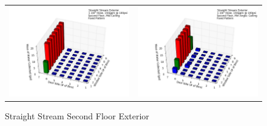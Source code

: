 \documentclass{article}
\begin{document}
\begin{appendices}
\begin{figure}[ht]
{\begin{tabular*}{\textwidth}{lr}
\includegraphics[width=3.2in]{../ADD_Analysis/Figures/15-12-07_151630_Datafile_Straight_Stream_Exterior.png} &
\includegraphics[width=3.2in]{../ADD_Analysis/Figures/15-12-07_152028_Datafile_Straight_Stream_Exterior.png} \\
\end{tabular*}}
\centering
{}
\caption{Straight Stream Second Floor Exterior}
\label{fig:Straight Stream Second Floor Exterior}
\end{figure}

\clearpage


\end{appendices}
\end{document}
